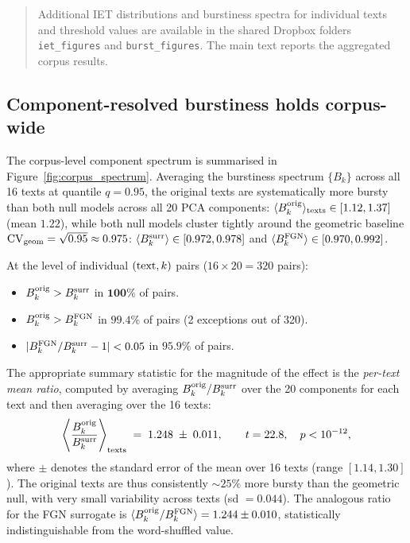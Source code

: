 \documentclass[12pt,a4paper]{article}
\newcommand{\bk}{B_k}
\newcommand{\CV}{\mathrm{CV}}
\begin{document}
\begin{quote}
Additional IET distributions and burstiness spectra for individual
texts and threshold values are available in the shared Dropbox folders
\texttt{iet\_figures} and \texttt{burst\_figures}. The main text reports
the aggregated corpus results.
\end{quote}



\subsection{Component-resolved burstiness holds corpus-wide}
\label{sec:corpus_ordering}

The corpus-level component spectrum is summarised in
Figure~\ref{fig:corpus_spectrum}.
Averaging the burstiness spectrum $\{\bk\}$ across all 16 texts
at quantile $q = 0.95$, the original texts are systematically more
bursty than both null models across all 20 PCA components:
$\langle B_k^{\rm orig}\rangle_{\rm texts} \in [1.12, 1.37]$
(mean $1.22$), while both null models cluster tightly around
the geometric baseline $\CV_{\rm geom} = \sqrt{0.95} \approx 0.975$:
$\langle B_k^{\rm surr}\rangle \in [0.972, 0.978]$ and
$\langle B_k^{\rm FGN}\rangle \in [0.970, 0.992]$.

At the level of individual $({\rm text}, k)$ pairs
($16 \times 20 = 320$ pairs):
\begin{itemize}
  \item $B_k^{\rm orig} > B_k^{\rm surr}$ in $\mathbf{100\%}$ of pairs.
  \item $B_k^{\rm orig} > B_k^{\rm FGN}$ in $\mathbf{99.4\%}$ of pairs
        (2 exceptions out of 320).
  \item $|B_k^{\rm FGN}/B_k^{\rm surr} - 1| < 0.05$ in
        $\mathbf{95.9\%}$ of pairs.
\end{itemize}

The appropriate summary statistic for the magnitude of the effect
is the \emph{per-text mean ratio}, computed by averaging
$B_k^{\rm orig}/B_k^{\rm surr}$ over the 20 components for each
text and then averaging over the 16 texts:
\begin{equation}
  \left\langle \frac{B_k^{\rm orig}}{B_k^{\rm surr}}
  \right\rangle_{\rm texts}
  \;=\; 1.248 \;\pm\; 0.011,
  \qquad t = 22.8,\quad p < 10^{-12},
  \label{eq:ratio_corpus}
\end{equation}
where $\pm$ denotes the standard error of the mean over 16 texts
(range $[1.14, 1.30]$).
The original texts are thus consistently $\sim 25\%$ more bursty
than the geometric null, with very small variability across texts
(sd $= 0.044$).
The analogous ratio for the FGN surrogate is
$\langle B_k^{\rm orig}/B_k^{\rm FGN}\rangle = 1.244 \pm 0.010$,
statistically indistinguishable from the word-shuffled value.
\end{document}
